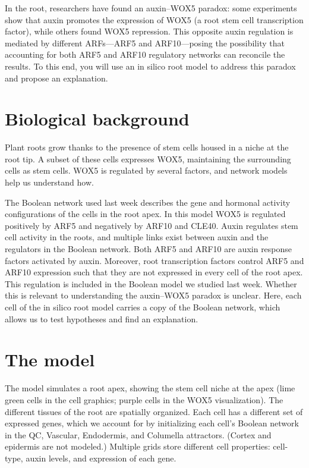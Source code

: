 \documentclass[
  letterpaper,
  DIV=11,
  numbers=noendperiod]{scrreprt}
\theoremstyle{definition}
\theoremstyle{remark}
\begin{document}
In the root, researchers have found an auxin--WOX5 paradox: some
experiments show that auxin promotes the expression of WOX5 (a root stem
cell transcription factor), while others found WOX5 repression. This
opposite auxin regulation is mediated by different ARFs---ARF5 and
ARF10---posing the possibility that accounting for both ARF5 and ARF10
regulatory networks can reconcile the results. To this end, you will use
an in silico root model to address this paradox and propose an
explanation.

\section{Biological background}\label{biological-background}

Plant roots grow thanks to the presence of stem cells housed in a niche
at the root tip. A subset of these cells expresses WOX5, maintaining the
surrounding cells as stem cells. WOX5 is regulated by several factors,
and network models help us understand how.

The Boolean network used last week describes the gene and hormonal
activity configurations of the cells in the root apex. In this model
WOX5 is regulated positively by ARF5 and negatively by ARF10 and CLE40.
Auxin regulates stem cell activity in the roots, and multiple links
exist between auxin and the regulators in the Boolean network. Both ARF5
and ARF10 are auxin response factors activated by auxin. Moreover, root
transcription factors control ARF5 and ARF10 expression such that they
are not expressed in every cell of the root apex. This regulation is
included in the Boolean model we studied last week. Whether this is
relevant to understanding the auxin--WOX5 paradox is unclear. Here, each
cell of the in silico root model carries a copy of the Boolean network,
which allows us to test hypotheses and find an explanation.

\section{The model}\label{the-model}

The model simulates a root apex, showing the stem cell niche at the apex
(lime green cells in the cell graphics; purple cells in the WOX5
visualization). The different tissues of the root are spatially
organized. Each cell has a different set of expressed genes, which we
account for by initializing each cell's Boolean network in the QC,
Vascular, Endodermis, and Columella attractors. (Cortex and epidermis
are not modeled.) Multiple grids store different cell properties:
cell-type, auxin levels, and expression of each gene.
\end{document}
